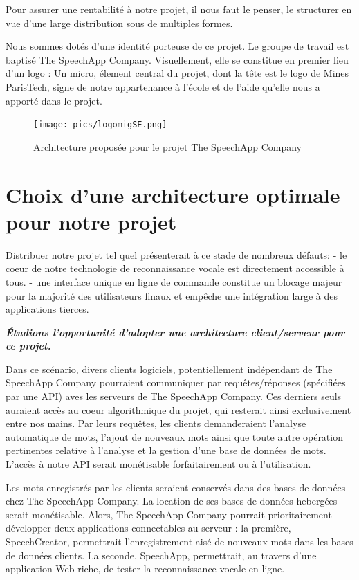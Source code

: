 \documentclass[a4paper,12pt]{report}
\begin{document}
Pour assurer une rentabilité à notre projet, il nous faut le penser, le structurer en vue d'une large distribution sous de multiples formes.

\medskip{}

Nous sommes dotés d'une identité porteuse de ce projet.
Le groupe de travail est baptisé The SpeechApp Company.
Visuellement, elle se constitue en premier lieu d'un logo : Un micro, élement central du projet, dont la tête est le logo de Mines ParisTech, signe de notre appartenance à l'école et de l'aide qu'elle nous a apporté dans le projet.

\begin{figure}[H]
	\begin{center}
	\texttt{[image: pics/logomigSE.png]} 
	\end{center}
	\caption{Architecture proposée pour le projet The SpeechApp Company}
\end{figure}

\section{Choix d'une architecture optimale pour notre projet}

Distribuer notre projet tel quel présenterait à ce stade de nombreux défauts:
- le coeur de notre technologie de reconnaissance vocale est directement accessible à tous.
- une interface unique en ligne de commande constitue un blocage majeur pour la majorité des utilisateurs finaux et empêche une intégration large à des applications tierces.

\bigskip

\textbf{\emph{Étudions l'opportunité d'adopter une architecture client/serveur pour ce projet.}}

\bigskip

Dans ce scénario, divers clients logiciels, potentiellement indépendant de The SpeechApp Company pourraient communiquer par requêtes/réponses (spécifiées par une API) aves les serveurs de The SpeechApp Company. Ces derniers seuls auraient accès au coeur algorithmique du projet, qui resterait ainsi exclusivement entre nos mains. Par leurs requêtes, les clients demanderaient l'analyse automatique de mots, l'ajout de nouveaux mots ainsi que toute autre opération pertinentes relative à l'analyse et la gestion d'une base de données de mots. L'accès à notre API serait monétisable forfaitairement ou à l'utilisation.

\medskip

Les mots enregistrés par les clients seraient conservés dans des bases de données chez The SpeechApp Company. La location de ses bases de données hebergées serait monétisable.
Alors, The SpeechApp Company pourrait prioritairement développer deux applications connectables au serveur : la première, SpeechCreator, permettrait l'enregistrement aisé de nouveaux mots dans les bases de données clients. La seconde, SpeechApp, permettrait, au travers d'une application Web riche, de tester la reconnaissance vocale en ligne.
\end{document}
